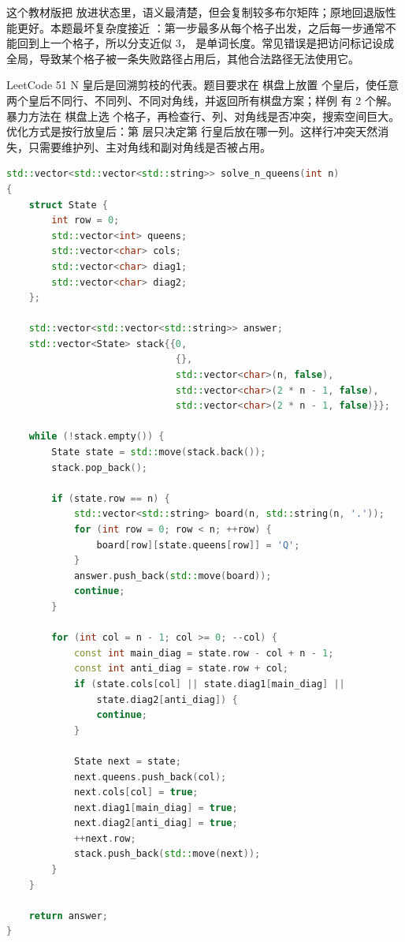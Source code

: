这个教材版把  放进状态里，语义最清楚，但会复制较多布尔矩阵；原地回退版性能更好。本题最坏复杂度接近 ：第一步最多从每个格子出发，之后每一步通常不能回到上一个格子，所以分支近似 3， 是单词长度。常见错误是把访问标记设成全局，导致某个格子被一条失败路径占用后，其他合法路径无法使用它。

LeetCode 51 N 皇后是回溯剪枝的代表。题目要求在  棋盘上放置  个皇后，使任意两个皇后不同行、不同列、不同对角线，并返回所有棋盘方案；样例  有 2 个解。暴力方法在  棋盘上选  个格子，再检查行、列、对角线是否冲突，搜索空间巨大。优化方式是按行放皇后：第  层只决定第  行皇后放在哪一列。这样行冲突天然消失，只需要维护列、主对角线和副对角线是否被占用。

\begin{lstlisting}[language=C++,caption={LeetCode 51 N 皇后：按行放置并维护三类占用}]
std::vector<std::vector<std::string>> solve_n_queens(int n)
{
    struct State {
        int row = 0;
        std::vector<int> queens;
        std::vector<char> cols;
        std::vector<char> diag1;
        std::vector<char> diag2;
    };

    std::vector<std::vector<std::string>> answer;
    std::vector<State> stack{{0,
                              {},
                              std::vector<char>(n, false),
                              std::vector<char>(2 * n - 1, false),
                              std::vector<char>(2 * n - 1, false)}};

    while (!stack.empty()) {
        State state = std::move(stack.back());
        stack.pop_back();

        if (state.row == n) {
            std::vector<std::string> board(n, std::string(n, '.'));
            for (int row = 0; row < n; ++row) {
                board[row][state.queens[row]] = 'Q';
            }
            answer.push_back(std::move(board));
            continue;
        }

        for (int col = n - 1; col >= 0; --col) {
            const int main_diag = state.row - col + n - 1;
            const int anti_diag = state.row + col;
            if (state.cols[col] || state.diag1[main_diag] ||
                state.diag2[anti_diag]) {
                continue;
            }

            State next = state;
            next.queens.push_back(col);
            next.cols[col] = true;
            next.diag1[main_diag] = true;
            next.diag2[anti_diag] = true;
            ++next.row;
            stack.push_back(std::move(next));
        }
    }

    return answer;
}
\end{lstlisting}

